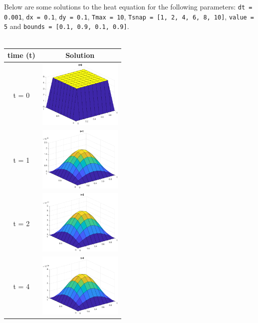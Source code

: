 \documentclass[]{report}
\def\incode#1{\texttt{#1}}
\begin{document}
		\newpage 
		Below are some solutions to the heat equation for the following parameters: \incode{dt = 0.001}, \incode{dx = 0.1}, \incode{dy = 0.1}, \incode{Tmax = 10}, \incode{Tsnap = [1, 2, 4, 6, 8, 10]}, \incode{value = 5} and \incode{bounds = [0.1, 0.9, 0.1, 0.9]}. \\\\
	
	\begin{tabular}{|c|c|}
		\hline
		time (t) & Solution \\
		\hline
		t = 0 & \includegraphics[width=4cm]{heat/h2_t0.eps} \\
		\hline
		t = 1 & \includegraphics[width=4cm]{heat/h2_t1.eps} \\
		\hline
		t = 2 & \includegraphics[width=4cm]{heat/h2_t2.eps} \\
		\hline
		t = 4 & \includegraphics[width=4cm]{heat/h2_t3.eps} \\
		\hline
	\end{tabular}
\end{document}
